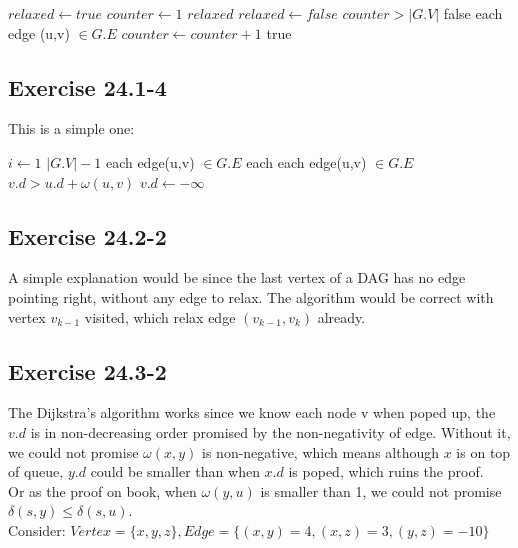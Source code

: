 \documentclass[]{article}
\begin{document}
\begin{codebox}
	\li {}
	\li $relaxed \leftarrow true$
	\li $counter \leftarrow 1$
	\li \While $relaxed$ 
	\li \Do $relaxed \leftarrow false$
	\li \If $counter > |G.V|$
	\li \Then \Return false \End
	\li \For each edge (u,v) $\in G.E$
	\li \Do {} \End
	\li $counter \leftarrow counter + 1$ \End
	\li \Return true
\end{codebox}

\subsection{Exercise 24.1-4}

This is a simple one:

\begin{codebox}
	\li {}
	\li \For $i \leftarrow 1$ \To $|G.V|-1$
	\li \Do \For each edge(u,v) $\in G.E$
	\li \Do {} \End \End
	\li \For each each edge(u,v) $\in G.E$
	\li \Do \If $v.d > u.d + \omega(u,v)$
	\li \Then $v.d \leftarrow -\infty$ \End \End
\end{codebox}

\subsection{Exercise 24.2-2}

A simple explanation would be since the last vertex of a DAG has no edge pointing right, without any edge to relax. The algorithm would be correct with vertex $v_{k-1}$ visited, which relax edge $(v_{k-1}, v_{k})$ already.

\subsection{Exercise 24.3-2}

The Dijkstra’s algorithm works since we know each node v when poped up, the $v.d$ is in non-decreasing order promised by the non-negativity of edge. Without it, we could not promise $\omega(x,y)$ is non-negative, which means although $x$ is on top of queue, $y.d$ could be smaller than when $x.d$ is poped, which ruins the proof.\\
Or as the proof on book, when $\omega(y,u)$ is smaller than 1, we could not promise $\delta(s,y) \le \delta(s,u)$.\\
Consider: $Vertex = \{x,y,z\}, Edge = \{(x,y)=4, (x,z)=3, (y,z)=-10\}$
\end{document}
